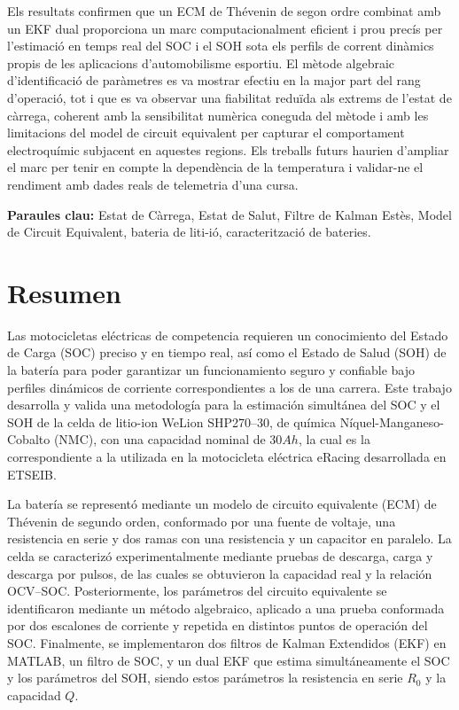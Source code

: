 Els resultats confirmen que un ECM de Thévenin de segon ordre combinat amb un EKF dual 
proporciona un marc computacionalment eficient i prou precís per l'estimació en 
temps real del SOC i el SOH sota els perfils de corrent dinàmics propis de les 
aplicacions d'automobilisme esportiu. El mètode algebraic d'identificació de 
paràmetres es va mostrar efectiu en la major part del rang d'operació, tot i que es va 
observar una fiabilitat reduïda als extrems de l'estat de càrrega, coherent amb la 
sensibilitat numèrica coneguda del mètode i amb les limitacions del model de circuit 
equivalent per capturar el comportament electroquímic subjacent en aquestes regions. 
Els treballs futurs haurien d'ampliar el marc per tenir en compte la dependència de la 
temperatura i validar-ne el rendiment amb dades reals de telemetria d'una cursa.

\vspace{1em}
\noindent\textbf{Paraules clau:} Estat de Càrrega, Estat de Salut, Filtre de Kalman 
Estès, Model de Circuit Equivalent, bateria de liti-ió, caracterització de bateries.


\chapter*{Resumen}
Las motocicletas eléctricas de competencia requieren un conocimiento del Estado de Carga (SOC) preciso y en 
tiempo real, así como el Estado de Salud (SOH) de la batería para poder 
garantizar un funcionamiento seguro y confiable bajo perfiles dinámicos de corriente 
correspondientes a los de una carrera. Este trabajo desarrolla y valida una metodología
para la estimación simultánea del SOC y el SOH de la celda de litio-ion WeLion SHP270--30, de química 
Níquel-Manganeso-Cobalto (NMC), con una capacidad nominal de $30 Ah$, 
la cual es la correspondiente a la utilizada en la motocicleta eléctrica eRacing desarrollada 
en ETSEIB.

La batería se representó mediante un modelo de circuito equivalente (ECM) de Thévenin 
de segundo orden, conformado por una fuente de voltaje, una resistencia en serie y dos 
ramas con una resistencia y un capacitor en paralelo. La celda se caracterizó experimentalmente 
mediante pruebas de descarga, carga y descarga por pulsos, de las cuales se obtuvieron 
la capacidad real y la relación OCV--SOC. Posteriormente, los parámetros del circuito 
equivalente se identificaron mediante un método algebraico, aplicado a una prueba 
conformada por dos escalones de corriente y repetida en distintos puntos de operación del SOC. 
Finalmente, se implementaron dos filtros de Kalman Extendidos (EKF) en MATLAB, un 
filtro de SOC, y un dual EKF que estima simultáneamente el SOC y los parámetros del 
SOH, siendo estos parámetros la resistencia en serie $R_0$ y la capacidad $Q$.

